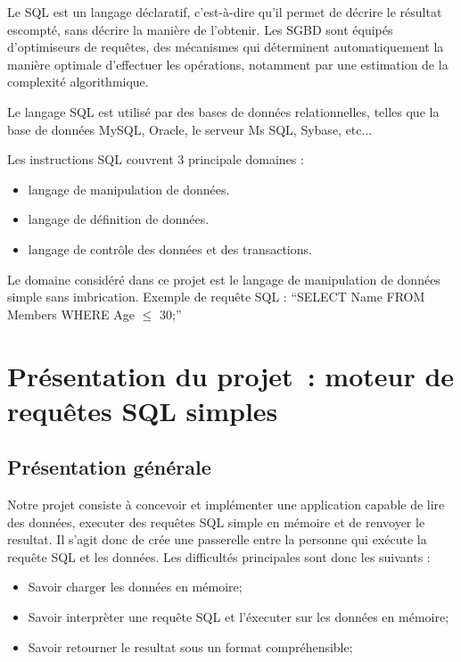 \documentclass[oneside,13pt,a4paper]{report}
\begin{document}
Le SQL est un langage déclaratif, c'est-à-dire qu'il permet de décrire le résultat escompté, sans décrire la manière de l'obtenir.
Les SGBD sont équipés d'optimiseurs de requêtes, des mécanismes qui déterminent automatiquement la manière optimale d'effectuer les opérations,
notamment par une estimation de la complexité algorithmique.

Le langage SQL est utilisé par des bases de données relationnelles, telles que la base de données MySQL, Oracle, le serveur Ms SQL, Sybase, etc...

Les instructions SQL couvrent 3 principale domaines :
\begin{itemize}
	\item langage de manipulation de données.
	\item langage de définition de données.
	\item langage de contrôle des données et des transactions.
\end{itemize}
\vspace{0.3cm}

Le domaine considéré dans ce projet est le langage de manipulation de données simple sans imbrication.
Exemple de requête SQL : \enquote{SELECT Name FROM Members WHERE Age $ \leq $ 30;}


\chapter{Présentation du projet : moteur de requêtes SQL simples}

\section{Présentation générale}

Notre projet consiste à concevoir et implémenter une application capable de lire des données, executer des requêtes SQL simple en mémoire et de renvoyer le resultat.
Il s’agit donc de crée une passerelle entre la personne qui exécute la requête SQL et les données.
Les difficultés principales sont donc les suivants :
\vspace{0.3cm}
\begin{itemize}
	\item Savoir charger les données en mémoire;
	\item Savoir interprèter une requête SQL et l'éxecuter sur les données en mémoire;
	\item Savoir retourner le resultat sous un format compréhensible;
\end{itemize}
\vspace{0.3cm}
\end{document}
